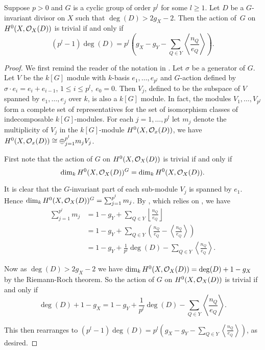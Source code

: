 \begin{prop}\label{nakaj}
Suppose $p>0$ and $G$ is a cyclic group of order $p^l$ for some $l\geq 1$.
Let $D$ be a $G$-invariant divisor on $X$ such that $\deg(D)>2g_X-2$.
Then the action of~$G$ on $H^0(X,{\cal O}_X(D))$ is trivial if and only if
\[ 
(p^l-1)\deg(D)=p^l\left(g_X-g_Y-\sum_{Q\in Y}\left\langle \frac{n_Q}{e_Q} \right\rangle\right).
\]
\end{prop}
\begin{proof}
We first remind the reader of the notation in \cite{kako}.
Let $\sigma$ be a generator of $G$.
Let $V$ be the $k[G]$ module with $k$-basis $e_1,\ldots ,e_{p^l}$ and $G$-action defined by $\sigma\cdot e_i=e_i+e_{i-1}$, $1\leq i \leq p^l,\ e_0=0$.
Then $V_j$, defined to be the subspace of $V$ spanned by $e_1,\ldots ,e_j$ over $k$, is also a $k[G]$ module.
In fact, the modules $V_1,\ldots ,V_{p^l}$ form a complete set of representatives for the set of isomorphism classes of indecomposable $k[G]$-modules. For each $j=1,\ldots,p^l$ let $m_j$ denote the multiplicity of $V_j$ in the $k[G]$-module $H^0(X,{\cal O}_x(D))$, \ie we have $H^0(X,{\cal O}_x(D))\cong \oplus_{j=1}^{p^l}m_jV_j$.



First note that the action of $G$ on $H^0(X,{\cal O}_X(D))$ is trivial if and only if
\begin{equation}\label{triva}
\dim_k H^0(X,{\cal O}_X(D))^G =\dim_k H^0(X,{\cal O}_X(D)).
\end{equation}

It is clear that the $G$-invariant part of each sub-module $V_j$ is spanned by $e_1$. 
Hence $\dim_kH^0(X,{\cal O}_X(D))^G = \sum_{j=1}^{p^l} m_j$.
By \cite[Thm. 2.1]{quaddiffequi}, which relies on \cite{cohogsheaves}, we have
\begin{align*}
\sum_{j=1}^{p^l} m_j & =  1- g_Y +\sum_{Q\in Y} \left\lfloor \frac{n_Q}{e_Q}\right\rfloor\\
& =  1- g_Y + \sum_{Q\in Y} \left( \frac{n_Q}{e_Q} - \left\langle \frac{n_Q}{e_Q}\right\rangle \right) \\
& =  1 - g_Y + \frac{1}{p^l}\deg(D) - \sum_{Q\in Y} \left\langle \frac{n_Q}{e_Q} \right\rangle.
\end{align*}

Now as $\deg(D)>2g_X-2$ we have $\dim_kH^0(X,{\cal O}_X(D)) =\deg(D)+1-g_X$ by the Riemann-Roch theorem. 
So the action of $G$ on $H^0(X,{\cal O}_X(D))$ is trivial if and only if
\begin{equation*}
\deg(D)+1-g_X  = 1 - g_Y + \frac{1}{p^l}\deg(D) - \sum_{Q\in Y}\left\langle \frac{n_Q}{e_Q} \right\rangle. \label{hi}
\end{equation*}

This then rearranges to $(p^l-1)\deg(D)=p^l\left(g_X-g_Y-\sum_{Q\in Y}\left\langle \frac{n_Q}{e_Q} \right\rangle\right)$, as desired.
\end{proof}

